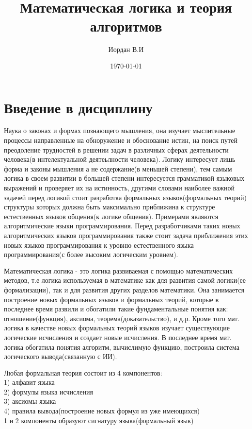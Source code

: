 \documentclass[a4paper, 12pt]{article}
\title{Математическая логика и теория алгоритмов}
\author{Иордан В.И}
\date{\today}
\begin{document}
\sffamily
\maketitle
\section*{Введение в дисциплину}
Наука о законах и формах познающего мышления, она изучает мыслительные процессы направленные на обноружение и обоснование истин, на поиск путей преодоление трудностей в решении задач в различных сферах деятельности человека(в интелектуальной деятеьлности человека). Логику интересует лишь форма и законы мышления а не содержание(в меньшей степени), тем самым логика в своем развитии в большей степени интересуется грамматикой языковых выражений и проверяет их на истинность, другими словами наиболее важной задачей перед логикой стоит разработка формальных языков(формальных теорий) структуры которых должна быть максимально приближина к структуре естественных языков общения(к логике общения). Примерами являются алгоритмические языки программирования. Перед разработчиками таких новых алгоритмических языков программирования также стоит задача приближения этих новых языков программирования к уровню естественного языка программирования(с более высоким логическим уровнем). 

Математическая логика - это логика развиваемая с помощью математических методов, т.е логика используемая в математике как для развития самой логики(ее формализации), так и для развития других разделов математики. Она занимается построение новых формальных языков и формальных теорий, которые в последнее время развили и обогатили такие фундаментальные понятия как: отношение(функция), аксиома, теорема(доказательство), и д.р. Кроме того мат. логика в качестве новых формальных теорий языков изучает существующие логические исчисления и создает новые исчисления. В последнее время мат. логика обогатила понятия алгоритм, вычислимую функцию, построила система логического вывода(связанную с ИИ).
\newpage

Любая формальная теория состоит из 4 компонентов:\\
1) алфавит языка\\
2) формулы языка исчисления\\
3) аксиомы языка\\
4) правила вывода(построение новых формул из уже имеющихся)\\

1 и 2 компоненты образуют сигнатуру языка(формальный язык)\\
\end{document}

